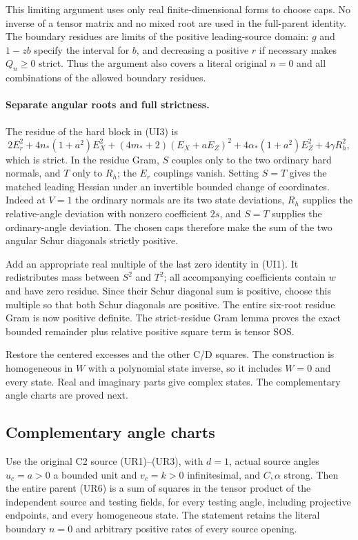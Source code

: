 This limiting argument uses only real finite-dimensional forms to
choose caps. No inverse of a tensor matrix and no mixed root are
used in the full-parent identity. The boundary residues are limits
of the positive leading-source domain: $g$ and $1-zb$ specify the
interval for $b$, and decreasing a positive $r$ if necessary makes
$Q_n\ge0$ strict. Thus the argument also covers a literal original
$n=0$ and all combinations of the allowed boundary residues.

\paragraph{Separate angular roots and full strictness.}
The residue of the hard block in (UI3) is
\[
 2E_r^2+4n_*(1+a^2)E_X^2
 +(4m_*+2)(E_X+aE_Z)^2+4\alpha_*(1+a^2)E_Z^2
 +4\gamma R_h^2,
\]
which is strict. In the residue Gram, $S$ couples only to the two
ordinary hard normals, and $T$ only to $R_h$; the $E_r$ couplings
vanish. Setting $S=T$ gives the matched leading Hessian under an
invertible bounded change of coordinates. Indeed at $V=1$ the
ordinary normals are its two state deviations, $R_h$ supplies the
relative-angle deviation with nonzero coefficient $2s$, and
$S=T$ supplies the ordinary-angle deviation. The chosen caps therefore
make the sum of the two angular Schur diagonals strictly positive.

Add an appropriate real multiple of the last zero identity in (UI1).
It redistributes mass between $S^2$ and $T^2$; all accompanying
coefficients contain $w$ and have zero residue. Since their Schur
diagonal sum is positive, choose this multiple so that both Schur
diagonals are positive. The entire six-root residue Gram is now
positive definite. The strict-residue Gram lemma proves the exact
bounded remainder plus relative positive square term is tensor SOS.

Restore the centered excesses and the other C/D squares. The construction
is homogeneous in $W$ with a polynomial state inverse, so it includes
$W=0$ and every state. Real and imaginary parts give complex states.
The complementary angle charts are proved next.

\subsection{Complementary angle charts}

\label{p6b22e944bd7c:sec:ui-all-tests-recovered}

\begin{theorem}
Use the original C2 source (UR1)--(UR3), with $d=1$, actual source
angles $u_c=a>0$ a bounded unit and $v_c=k>0$ infinitesimal, and
$C,\alpha$ strong. Then the entire parent (UR6) is a sum of squares
in the tensor product of the independent source and testing fields,
for every testing angle, including projective endpoints, and every
homogeneous state. The statement retains the literal boundary $n=0$
and arbitrary positive rates of every source opening.
\end{theorem}

